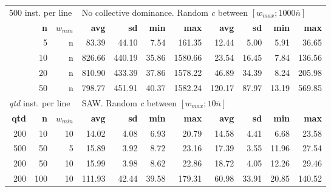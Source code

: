 \documentclass[runningheads,a4paper]{llncs}
\begin{document}
\begin{table}
\begin{tabular}{@{\extracolsep{4pt}}rrrrrrrrrrr@{}}
\hline

\multicolumn{3}{l}{500 inst. per line} & \multicolumn{8}{l}{No collective dominance. Random \emph{c} between \([w_{max}; 1000\overline{n}]\)}\\
\cline{1-3}\cline{4-11}
& \textbf{n} & \(w_{min}\) & \textbf{avg} & \textbf{sd} & \textbf{min} & \textbf{max} & \textbf{avg} & \textbf{sd} & \textbf{min} & \textbf{max}\\
\cline{1-3}\cline{4-7}\cline{8-11}
&  5 & n & 83.39 & 44.10 & 7.54 & 161.35 & 12.44 & 5.00 & 5.91 & 36.65\\
& 10 & n & 826.66 & 440.19 & 35.86 & 1580.66 & 23.54 & 16.45 & 7.84 & 136.56\\
& 20 & n & 810.90 & 433.39 & 37.86 & 1578.22 & 46.89 & 34.39 & 8.24 & 205.98\\
& 50 & n & 798.77 & 451.91 & 40.37 & 1582.24 & 120.17 & 87.97 & 13.19 & 569.85\\

\hline

\multicolumn{3}{l}{\emph{qtd} inst. per line} & \multicolumn{8}{l}{SAW. Random \emph{c} between \([w_{max}; 10\overline{n}]\)}\\
\cline{1-3}\cline{4-11}
\textbf{qtd} & \textbf{n} & \(w_{min}\) & \textbf{avg} & \textbf{sd} & \textbf{min} & \textbf{max} & \textbf{avg} & \textbf{sd} & \textbf{min} & \textbf{max}\\
\cline{1-3}\cline{4-7}\cline{8-11}
~200 &  10 & 10 & 14.02 & 4.08 & 6.93 & 20.79 & 14.58 & 4.41 & 6.68 & 23.58\\
~500 &  50 &  5 & 15.89 & 3.92 & 8.72 & 23.16 & 17.39 & 3.55 & 11.96 & 27.54\\
~200 &  50 & 10 & 15.99 & 3.98 & 8.62 & 22.86 & 18.72 & 4.05 & 12.26 & 29.46\\
~200 & 100 & 10 & 111.93 & 42.44 & 39.58 & 179.31 & 60.98 & 33.91 & 20.85 & 140.52\\
\hline

\end{tabular}
\end{table}


\end{document}
